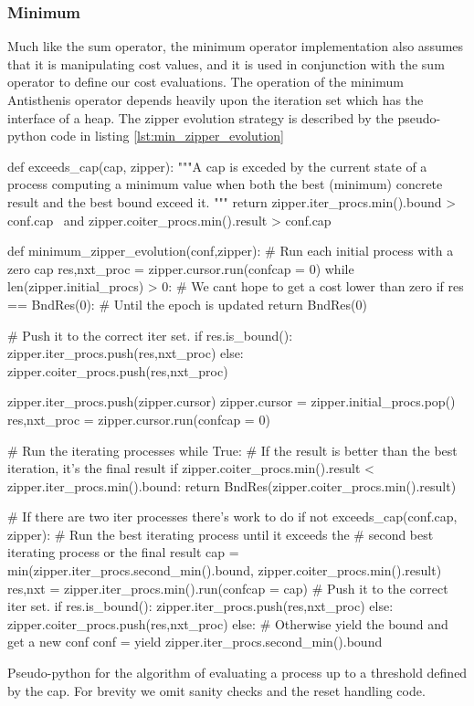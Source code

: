 \subsubsection{Minimum}

Much like the sum operator, the minimum operator implementation also
assumes that it is manipulating cost values, and it is used in
conjunction with the sum operator to define our cost evaluations. The
operation of the minimum Antisthenis operator depends heavily upon the
iteration set which has the interface of a heap. The zipper evolution
strategy is described by the pseudo-python code in listing
\ref{lst:min_zipper_evolution}

\begin{code}
\begin{pycode}
def exceeds_cap(cap, zipper):
    """A cap is exceded by the current state of a process computing
    a minimum value when both the best (minimum) concrete result and the
    best bound exceed it.
    """
    return zipper.iter_procs.min().bound > conf.cap \
        and zipper.coiter_procs.min().result > conf.cap \


def minimum_zipper_evolution(conf,zipper):
    # Run each initial process with a zero cap
    res,nxt_proc = zipper.cursor.run(conf{cap = 0})
    while len(zipper.initial_procs) > 0:
        # We cant hope to get a cost lower than zero
        if res == BndRes(0):
            # Until the epoch is updated
            return BndRes(0)

        # Push it to the correct iter set.
        if res.is_bound():
            zipper.iter_procs.push(res,nxt_proc)
        else:
            zipper.coiter_procs.push(res,nxt_proc)

        zipper.iter_procs.push(zipper.cursor)
        zipper.cursor = zipper.initial_procs.pop()
        res,nxt_proc = zipper.cursor.run(conf{cap = 0})

    # Run the iterating processes
    while True:
        # If the result is better than the best iteration, it's the final result
        if zipper.coiter_procs.min().result < zipper.iter_procs.min().bound:
            return BndRes(zipper.coiter_procs.min().result)

        # If there are two iter processes there's work to do
        if not exceeds_cap(conf.cap, zipper):
            # Run the best iterating process until it exceeds the
            # second best iterating process or the final result
            cap = min(zipper.iter_procs.second_min().bound,
                      zipper.coiter_procs.min().result)
            res,nxt =  zipper.iter_procs.min().run(conf{cap = cap})
            # Push it to the correct iter set.
            if res.is_bound():
                zipper.iter_procs.push(res,nxt_proc)
            else:
                zipper.coiter_procs.push(res,nxt_proc)
        else:
            # Otherwise yield the bound and get a new conf
            conf = yield zipper.iter_procs.second_min().bound
\end{pycode}
  \caption{\label{lst:min_zipper_evolution}Pseudo-python for the
    algorithm of evaluating a process up to a threshold defined by the
    cap. For brevity we omit sanity checks and the reset handling code.}
\end{code}

